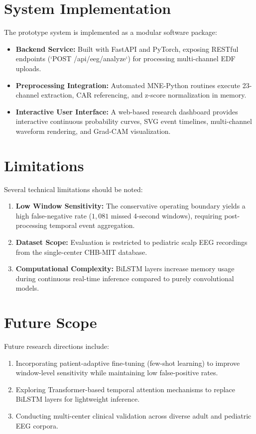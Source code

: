 \documentclass[conference]{IEEEtran}
\begin{document}
\section{System Implementation}
The prototype system is implemented as a modular software package:
\begin{itemize}
    \item \textbf{Backend Service:} Built with FastAPI and PyTorch, exposing RESTful endpoints (`POST /api/eeg/analyze`) for processing multi-channel EDF uploads.
    \item \textbf{Preprocessing Integration:} Automated MNE-Python routines execute 23-channel extraction, CAR referencing, and z-score normalization in memory.
    \item \textbf{Interactive User Interface:} A web-based research dashboard provides interactive continuous probability curves, SVG event timelines, multi-channel waveform rendering, and Grad-CAM visualization.
\end{itemize}

\FloatBarrier

\section{Limitations}
Several technical limitations should be noted:
\begin{enumerate}
    \item \textbf{Low Window Sensitivity:} The conservative operating boundary yields a high false-negative rate ($1,081$ missed 4-second windows), requiring post-processing temporal event aggregation.
    \item \textbf{Dataset Scope:} Evaluation is restricted to pediatric scalp EEG recordings from the single-center CHB-MIT database.
    \item \textbf{Computational Complexity:} BiLSTM layers increase memory usage during continuous real-time inference compared to purely convolutional models.
\end{enumerate}

\section{Future Scope}
Future research directions include:
\begin{enumerate}
    \item Incorporating patient-adaptive fine-tuning (few-shot learning) to improve window-level sensitivity while maintaining low false-positive rates.
    \item Exploring Transformer-based temporal attention mechanisms to replace BiLSTM layers for lightweight inference.
    \item Conducting multi-center clinical validation across diverse adult and pediatric EEG corpora.
\end{enumerate}
\end{document}
